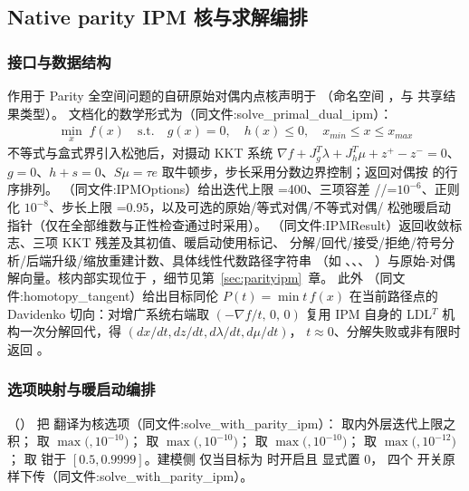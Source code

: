 \subsection{Native parity IPM 核与求解编排}\label{subsec:acopfnative:kernel}

\subsubsection*{接口与数据结构}
作用于 Parity 全空间问题的自研原始对偶内点核声明于
（命名空间
，与  共享结果类型）。
文档化的数学形式为（同文件:solve\_primal\_dual\_ipm）：
\begin{align*}
\min_x\; f(x)\quad \text{s.t.}\quad g(x)=0,\quad h(x)\le 0,\quad x_{min}\le x\le x_{max}
\end{align*}
不等式与盒式界引入松弛后，对摄动 KKT 系统
$\nabla f+J_g^{T}\lambda+J_h^{T}\mu+z^{+}-z^{-}=0$、$g=0$、$h+s=0$、$S\mu=\tau e$
取牛顿步，步长采用分数边界控制；返回对偶按  的行序排列。
（同文件:IPMOptions）给出迭代上限 =400、三项容差
//=$10^{-6}$、正则化
$10^{-8}$、步长上限 =0.95，以及可选的原始/等式对偶/不等式对偶/
松弛暖启动指针（仅在全部维数与正性检查通过时采用）。
（同文件:IPMResult）返回收敛标志、三项 KKT 残差及其初值、暖启动使用标记、
分解/回代/接受/拒绝/符号分析/后端升级/缩放重建计数、具体线性代数路径字符串
（如 、、、
）与原始-对偶解向量。核内部实现位于
，细节见第~\ref{sec:parityipm}~章。
此外 （同文件:homotopy\_tangent）给出目标同伦 $P(t)=\min t\,f(x)$
在当前路径点的 Davidenko 切向：对增广系统右端取 $(-\nabla f/t,\,0,\,0)$ 复用
IPM 自身的 LDL$^{T}$ 机构一次分解回代，得 $(dx/dt,dz/dt,d\lambda/dt,d\mu/dt)$，
$t\approx0$、分解失败或非有限时返回 。

\subsubsection*{选项映射与暖启动编排}
（）
把  翻译为核选项（同文件:solve\_with\_parity\_ipm）：
 取内外层迭代上限之积； 取
$\max($$,10^{-10})$； 取
$\max($$,10^{-10})$； 取
$\max($$,10^{-10})$； 取
$\max($$,10^{-12})$； 取
 钳于 $[0.5,0.9999]$。建模侧
 仅当目标为  时开启且  显式置 0，
四个  开关原样下传（同文件:solve\_with\_parity\_ipm）。


